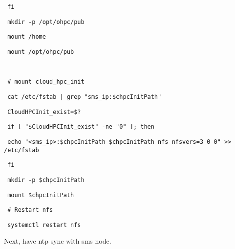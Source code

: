 \begin{section}
\begin{bash}\texttt{\small{ fi}}\end{bash}
\begin{bash}\texttt{\small{ mkdir -p /opt/ohpc/pub}}\end{bash}
\begin{bash}\texttt{\small{ mount /home}}\end{bash}
\begin{bash}\texttt{\small{ mount /opt/ohpc/pub}}\end{bash}
\begin{bash}\texttt{\small{ }}\end{bash}
\begin{bash}\texttt{\small{ \# mount cloud\_hpc\_init}}\end{bash}
\begin{bash}\texttt{\small{ cat /etc/fstab | grep "sms\_ip:\$chpcInitPath"}}\end{bash}
\begin{bash}\texttt{\small{ CloudHPCInit\_exist=\$?}}\end{bash}
\begin{bash}\texttt{\small{ if [ "\${CloudHPCInit\_exist}" -ne "0" ]; then}}\end{bash}
\begin{bash}\texttt{\small{     echo "<sms\_ip>:\$chpcInitPath \$chpcInitPath nfs nfsvers=3 0 0" >> /etc/fstab}}\end{bash}
\begin{bash}\texttt{\small{ fi}}\end{bash}
\begin{bash}\texttt{\small{ mkdir -p \$chpcInitPath}}\end{bash}
\begin{bash}\texttt{\small{ mount \$chpcInitPath}}\end{bash}
\begin{bash}\texttt{\small{ \# Restart nfs}}\end{bash}
\begin{bash}\texttt{\small{ systemctl restart nfs}}\end{bash}

Next, have ntp sync with sms node. 


\end{section}
